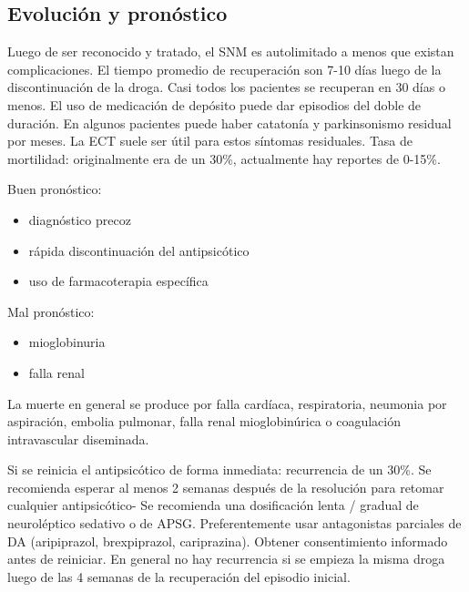 \subsection*{Evolución y pronóstico}
Luego de ser reconocido y tratado, el SNM es autolimitado a menos que existan complicaciones. El tiempo promedio de recuperación son 7-10 días luego de la discontinuación de la droga. Casi todos los pacientes se recuperan en 30 días o menos. El uso de medicación de depósito puede dar episodios del doble de duración. En algunos pacientes puede haber catatonía y parkinsonismo residual por meses. La ECT suele ser útil para estos síntomas residuales.
Tasa de mortilidad: originalmente era de un 30\%, actualmente hay reportes de 0-15\%.

Buen pronóstico:
\begin{itemize}
	\item diagnóstico precoz
	\item rápida discontinuación del antipsicótico
	\item uso de farmacoterapia específica
\end{itemize}
Mal pronóstico:
\begin{itemize}
	\item mioglobinuria
	\item falla renal
\end{itemize}
La muerte en general se produce por falla cardíaca, respiratoria, neumonia por aspiración, embolia pulmonar, falla renal mioglobinúrica o coagulación intravascular diseminada.

Si se reinicia el antipsicótico de forma inmediata: recurrencia de un 30\%. Se recomienda esperar al menos 2 semanas después de la resolución para retomar cualquier antipsicótico- Se recomienda una dosificación lenta / gradual de neuroléptico sedativo o de APSG. Preferentemente usar antagonistas parciales de DA (aripiprazol, brexpiprazol, cariprazina). Obtener consentimiento informado antes de reiniciar. En general no hay recurrencia si se empieza la misma droga luego de las 4 semanas de la recuperación del episodio inicial.
\printbibliography
